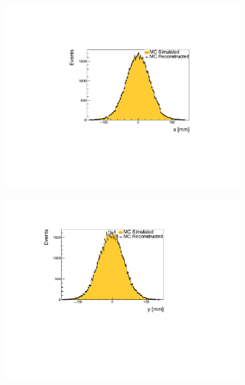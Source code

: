 \documentclass[11pt,a4paper]{article}
\begin{document}
\begin{figure}[t!]
\centering
\begin{subfigure}[t]{0.495\textwidth}
\centering
\includegraphics[width=0.99\textwidth]{figs/fig-tracker-x.pdf}
\caption{}
\end{subfigure}
\begin{subfigure}[t]{0.495\textwidth}
\centering
\includegraphics[width=0.99\textwidth]{figs/fig-tracker-y.pdf}
\caption{}
\end{subfigure}


\end{figure}
\end{document}
